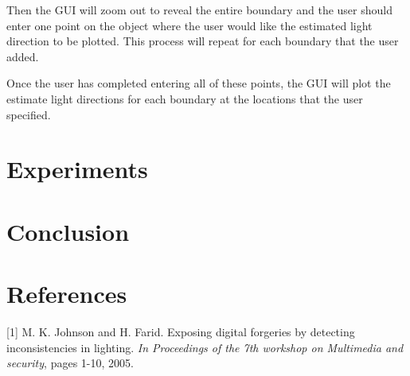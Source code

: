 \documentclass[10pt,twocolumn,letterpaper]{article}
\begin{document}
Then the GUI will zoom out to reveal the entire boundary and the user should enter one point on the object where the user would like the estimated light direction to be plotted. This process will repeat for each boundary that the user added.

Once the user has completed entering all of these points, the GUI will plot the estimate light directions for each boundary at the locations that the user specified.


\section{Experiments}

\section{Conclusion}

\section{References}

[1] M. K. Johnson and H. Farid. Exposing digital forgeries by detecting inconsistencies in lighting. \emph{In Proceedings of the 7th workshop on Multimedia and security}, pages 1-10, 2005.
\end{document}
